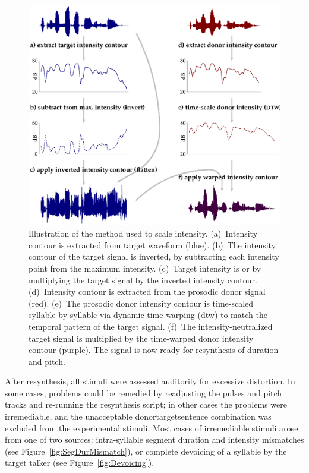 \begin{figure}
	\begin{centering}
	\includegraphics{figures/intensity/intensity2.eps}
	\caption[Intensity scaling in resynthesis]{Illustration of the method used to scale intensity.  (a)~Intensity contour is extracted from target waveform (blue).  (b)~The intensity contour of the target signal is inverted, by subtracting each intensity point from the maximum intensity.  (c)~Target intensity is  or  by multiplying the target signal by the inverted intensity contour.  (d)~Intensity contour is extracted from the prosodic donor signal (red).  (e)~The prosodic donor intensity contour is time-scaled syllable-by-syllable via dynamic time warping (\ac{dtw}) to match the temporal pattern of the target signal.  (f)~The intensity-neutralized target signal is multiplied by the time-warped donor intensity contour (purple).  The signal is now ready for \psola{} resynthesis of duration and pitch.\label{fig:IntenManip}}
	\end{centering}
\end{figure}

After resynthesis, all stimuli were assessed auditorily for excessive distortion.  In some cases, problems could be remedied by readjusting the pulses and pitch tracks and re-running the resynthesis script; in other cases the problems were irremediable, and the unacceptable donor\slsh{}target\slsh{}sentence combination was excluded from the experimental stimuli.  Most cases of irremediable stimuli arose from one of two sources: intra-syllable segment duration and intensity mismatches (see Figure~\ref{fig:SegDurMismatch}), or complete devoicing of a syllable by the target talker (see Figure~\ref{fig:Devoicing}).

